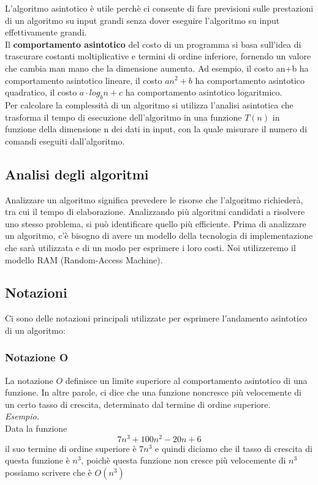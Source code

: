 \noindent L'algoritmo asintotico è utile perchè ci consente di fare previsioni sulle prestazioni di un algoritmo su input grandi senza dover eseguire l'algoritmo su input effettivamente grandi. \\
Il \textbf{comportamento asintotico} del costo di un programma si basa sull'idea di trascurare costanti moltiplicative e termini di ordine inferiore, fornendo un valore che cambia man mano che la dimensione aumenta. Ad esempio, il costo an+b ha comportamento asintotico lineare, il costo $an^2+b$ ha comportamento asintotico quadratico, il costo $a \cdot log_bn +c$ ha comportamento asintotico logaritmico.\\
Per calcolare la complessità di un algoritmo si utilizza l'analisi asintotica che trasforma il tempo di esecuzione dell'algoritmo in una funzione $T(n)$ in funzione della dimensione n dei dati in input, con la quale misurare il numero di comandi eseguiti dall'algoritmo.  

\subsection{Analisi degli algoritmi}
Analizzare un algoritmo significa prevedere le risorse che l'algoritmo richiederà, tra cui il tempo di elaborazione. Analizzando più algoritmi candidati a risolvere uno stesso problema, si può identificare quello più efficiente. Prima di analizzare un algoritmo, c'è bisogno di avere un modello della tecnologia di implementazione che sarà utilizzata e di un modo per esprimere i loro costi. Noi utilizzeremo il modello RAM (Random-Access Machine).

\subsection{Notazioni}
Ci sono delle notazioni principali utilizzate per esprimere l'andamento asintotico di un algoritmo:
\subsubsection{Notazione O}
La notazione $O$ definisce un limite superiore al comportamento asintotico di una funzione. In altre parole, ci dice che una funzione noncresce più velocemente di un certo tasso di crescita, determinato dal termine di ordine superiore.\medskip\\
\textit{Esempio.}\\
Data la funzione 
$$7n^3+100n^2-20n+6$$
il suo termine di ordine superiore è $7n^3$ e quindi diciamo che il tasso di crescita di questa funzione è $n^3$, poichè questa funzione non cresce più velocemente di $n^3$ possiamo scrivere che è $O(n^3)$

